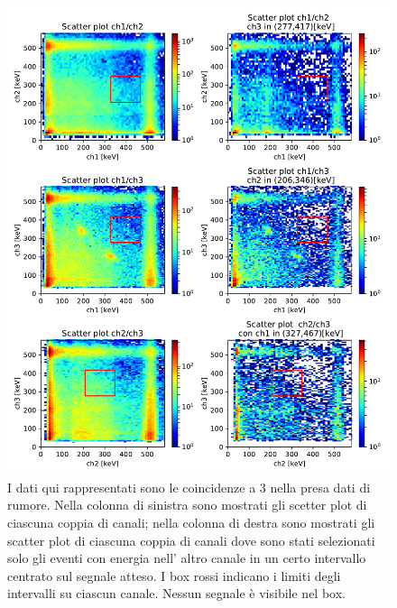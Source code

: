  \begin{figure}[h]
	\centering
	\includegraphics[width=38em]{immagini/3gamma_noise}
	\hspace{-3.5em}
	\caption{\label{fig:3gamma_noise} I dati qui rappresentati sono le coincidenze a 3 nella presa dati di rumore. Nella colonna di sinistra sono mostrati gli scetter plot di ciascuna coppia di canali; nella colonna di destra sono mostrati gli scatter plot di ciascuna coppia di canali dove sono stati selezionati solo gli eventi con energia nell' altro canale in un certo intervallo centrato sul segnale atteso. I box rossi indicano i limiti degli intervalli su ciascun canale. Nessun segnale è visibile nel box.}
\end{figure}

	



